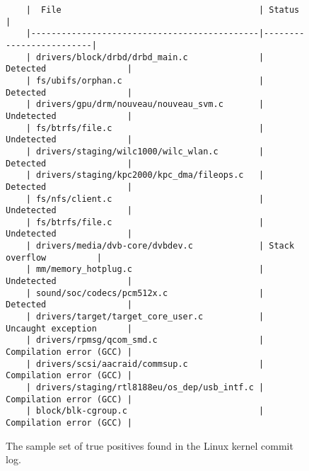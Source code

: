 \begin{figure}[H]
    \begin{verbatim}
    |  File                                       | Status                  | 
    |---------------------------------------------|-------------------------|
    | drivers/block/drbd/drbd_main.c              | Detected                | 
    | fs/ubifs/orphan.c                           | Detected                | 
    | drivers/gpu/drm/nouveau/nouveau_svm.c       | Undetected              | 
    | fs/btrfs/file.c                             | Undetected              | 
    | drivers/staging/wilc1000/wilc_wlan.c        | Detected                | 
    | drivers/staging/kpc2000/kpc_dma/fileops.c   | Detected                | 
    | fs/nfs/client.c                             | Undetected              | 
    | fs/btrfs/file.c                             | Undetected              | 
    | drivers/media/dvb-core/dvbdev.c             | Stack overflow          | 
    | mm/memory_hotplug.c                         | Undetected              | 
    | sound/soc/codecs/pcm512x.c                  | Detected                | 
    | drivers/target/target_core_user.c           | Uncaught exception      | 
    | drivers/rpmsg/qcom_smd.c                    | Compilation error (GCC) | 
    | drivers/scsi/aacraid/commsup.c              | Compilation error (GCC) | 
    | drivers/staging/rtl8188eu/os_dep/usb_intf.c | Compilation error (GCC) | 
    | block/blk-cgroup.c                          | Compilation error (GCC) | 
    \end{verbatim}
    \caption{The sample set of true positives found in the Linux kernel commit log.}
    \label{truepositives}
\end{figure}